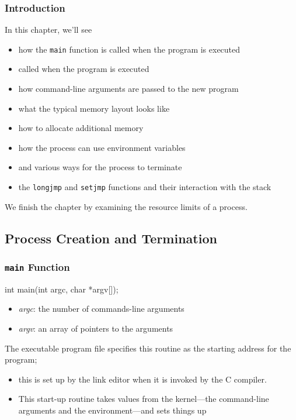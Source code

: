 \documentclass[newPxFont,sthlmFooter,nooffset]{beamer}
\begin{document}
\begin{frame}[t]
  \frametitle{Introduction}
In this chapter, we'll see
\begin{itemize}
\item how the \texttt{main} function is called when the program is executed
\item called when the program is executed
\item how command-line arguments are passed to the new program
\item what the typical memory layout looks like
\item how to allocate additional memory
\item how the process can use environment variables
\item and various ways for the process to terminate
\item the \texttt{longjmp} and \texttt{setjmp} functions and their interaction with the stack
\end{itemize}
We finish the chapter by examining the resource limits of a process.
\end{frame}



\subsection{Process Creation and Termination }

\begin{frame}[containsverbatim,t]
  \frametitle{\texttt{main} Function}
\begin{codedef}
int main(int argc, char *argv[]);
\end{codedef}
\begin{itemize}
\item \textit{argc}: the number of commands-line arguments
\item \textit{argv}: an array of pointers to the arguments
\end{itemize}

The executable program file specifies this routine as the starting address for the program;
\begin{itemize}
\item this is set up by the link editor when it is invoked by the C
  compiler.
\item This start-up routine takes values from the kernel---the
  command-line arguments and the environment---and sets things up
\end{itemize}

\end{frame}
\end{document}
